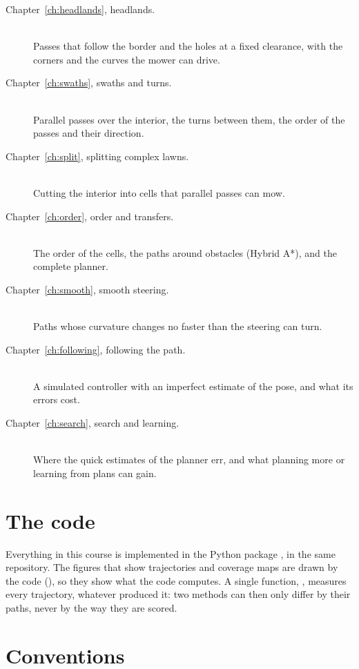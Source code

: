 \begin{description}
  \item[Chapter~\ref{ch:headlands}, headlands.]
    \leavevmode\\
    Passes that follow the border and the holes at a fixed clearance, with
    the corners and the curves the mower can drive.
  \item[Chapter~\ref{ch:swaths}, swaths and turns.]
    \leavevmode\\
    Parallel passes over the interior, the turns between them, the order of
    the passes and their direction.
  \item[Chapter~\ref{ch:split}, splitting complex lawns.]
    \leavevmode\\
    Cutting the interior into cells that parallel passes can mow.
  \item[Chapter~\ref{ch:order}, order and transfers.]
    \leavevmode\\
    The order of the cells, the paths around obstacles (Hybrid A*), and the
    complete planner.
  \item[Chapter~\ref{ch:smooth}, smooth steering.]
    \leavevmode\\
    Paths whose curvature changes no faster than the steering can turn.
  \item[Chapter~\ref{ch:following}, following the path.]
    \leavevmode\\
    A simulated controller with an imperfect estimate of the pose, and what
    its errors cost.
  \item[Chapter~\ref{ch:search}, search and learning.]
    \leavevmode\\
    Where the quick estimates of the planner err, and what planning more or
    learning from plans can gain.
\end{description}

\section{The code}

Everything in this course is implemented in the Python package
, in the same repository. The figures that show trajectories
and coverage maps are drawn by the code (), so
they show what the code computes. A single function, , measures
every trajectory, whatever produced it: two methods can then only differ by
their paths, never by the way they are scored.

\section{Conventions}

